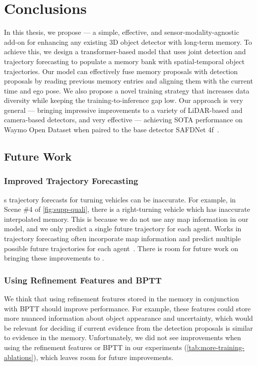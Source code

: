\chapter{Conclusions}
\label{sec:conclusion}

In this thesis, we propose \ourmodel{} --- a simple, effective, and sensor-modality-agnostic add-on for enhancing any existing
3D object detector with long-term memory.
To achieve this, we
design a transformer-based model
that uses joint detection and trajectory forecasting to populate a memory bank with spatial-temporal object trajectories.
Our model can effectively fuse memory proposals with detection proposals by reading previous memory entries and aligning them with the current time and ego pose.
We also propose a novel training strategy that increases data diversity while keeping the training-to-inference gap low.
Our approach is very general --- bringing impressive improvements to a variety of LiDAR-based and camera-based detectors, and very effective --- achieving SOTA performance on Waymo Open Dataset when paired to the base detector SAFDNet 4f~\cite{safdnet}.

\section{Future Work}

\subsection{Improved Trajectory Forecasting}

\ourmodel{}s trajectory forecasts for turning vehicles can be inaccurate.
For example, in Scene \#4 of \cref{fig:supp-quali}, there is a right-turning vehicle which has inaccurate interpolated memory.
This is because we do not use any map information in our model, and we only predict a single future trajectory for each agent.
Works in trajectory forecasting often incorporate map information and predict multiple possible future trajectories for each agent~\cite{cui2023gorela,casas2024detra}.
There is room for future work on bringing these improvements to \ourmodel{}.

\subsection{Using Refinement Features and BPTT}

We think that using refinement features stored in the memory in conjunction with BPTT should improve performance.
For example, these features could store more nuanced information about object appearance and uncertainty, which
would be relevant for deciding if current evidence from the detection proposals is similar to evidence in the memory.
Unfortunately, we did not see improvements when using the refinement features or BPTT in our experiments (\cref{tab:more-training-ablations}),
which leaves room for future improvements.


